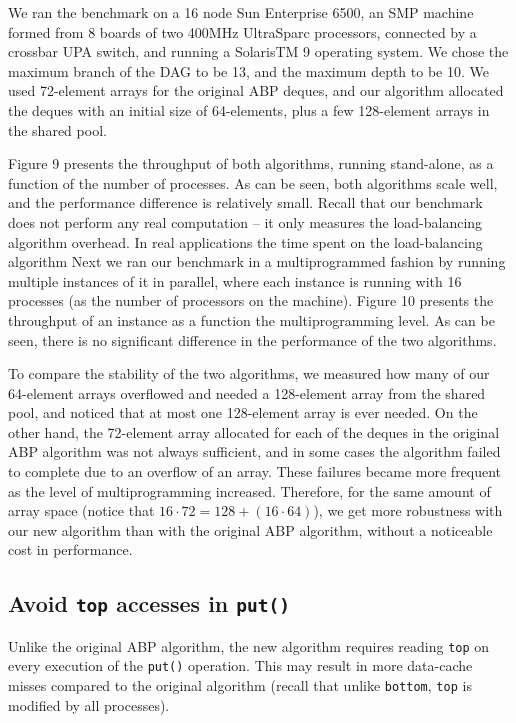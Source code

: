 We ran the benchmark on a 16 node Sun Enterprise 6500, an SMP machine
formed from 8 boards of two 400MHz UltraSparc processors, connected by
a crossbar UPA switch, and running a SolarisTM 9 operating system. We
chose the maximum branch of the DAG to be 13, and the maximum depth to
be 10. We used 72-element arrays for the original ABP deques, and our
algorithm allocated the deques with an initial size of 64-elements,
plus a few 128-element arrays in the shared pool.

Figure 9 presents the throughput of both algorithms, running
stand-alone, as a function of the number of processes. As can be
seen, both algorithms scale well, and the performance difference is
relatively small. Recall that our benchmark does not perform any real
computation -- it only measures the load-balancing algorithm
overhead. In real applications the time spent on the load-balancing
algorithm Next we ran our benchmark in a multiprogrammed fashion by
running multiple instances of it in parallel, where each instance is
running with 16 processes (as the number of processors on the
machine). Figure 10 presents the throughput of an instance as a
function the multiprogramming level. As can be seen, there is no
significant difference in the performance of the two algorithms.

To compare the stability of the two algorithms, we measured how many
of our 64-element arrays overflowed and needed a 128-element array
from the shared pool, and noticed that at most one 128-element array
is ever needed. On the other hand, the 72-element array allocated for
each of the deques in the original ABP algorithm was not always
sufficient, and in some cases the algorithm failed to complete due to
an overflow of an array. These failures became more frequent as the
level of multiprogramming increased. Therefore, for the same amount of
array space (notice that $16 \cdot 72 = 128 + (16 \cdot 64)$), we get
more robustness with our new algorithm than with the original ABP
algorithm, without a noticeable cost in performance.

\subsection{Avoid \lstinline!top! accesses in \lstinline!put()!}

Unlike the original ABP algorithm, the new algorithm requires reading
\lstinline!top! on every execution of the \lstinline!put()!
operation. This may result in more data-cache misses compared to the
original algorithm (recall that unlike \lstinline!bottom!,
\lstinline!top! is modified by all processes).

